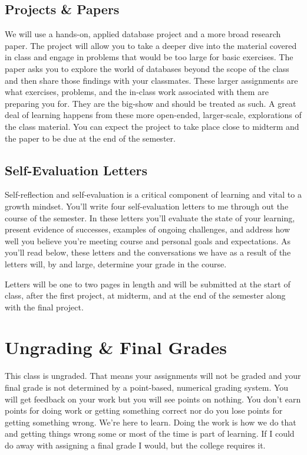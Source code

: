 \documentclass[10pt]{article}
\begin{document}
\subsection*{Projects & Papers}

We will use a hands-on, applied database project and a more broad research paper. The project will allow you to take a deeper dive into the material covered in class and engage in problems that would be too large for basic exercises.  The paper asks you to explore the world of databases beyond the scope of the class and then share those findings with your classmates. These larger assignments are what exercises, problems, and the in-class work associated with them are preparing you for.  They are the big-show and should be treated as such. A great deal of learning happens from these more open-ended, larger-scale, explorations of the class material. You can expect the project to take place close to midterm and the paper to be due at the end of the semester.

\subsection*{Self-Evaluation Letters}

Self-reflection and self-evaluation is a critical component of learning and vital to a growth mindset. You'll write four self-evaluation letters to me through out the course of the semester. In these letters you'll evaluate the state of your learning, present evidence of successes, examples of ongoing challenges, and address how well you believe you're meeting course and personal goals and expectations. As you'll read below, these letters and the conversations we have as a result of the letters will, by and large, determine your grade in the course.

Letters will be one to two pages in length and will be submitted at the start of class, after the first project, at midterm, and at the end of the semester along with the final project.


\section{Ungrading \& Final Grades}

This class is ungraded. That means your assignments will not be graded and your final grade is not determined by a point-based, numerical grading system. You will get feedback on your work but you will see points on nothing. You don't earn points for doing work or getting something correct nor do you lose points for getting something wrong. We're here to learn. Doing the work is how we do that and getting things wrong some or most of the time is part of learning. If I could do away with assigning a final grade I would, but the college requires it.
\end{document}
